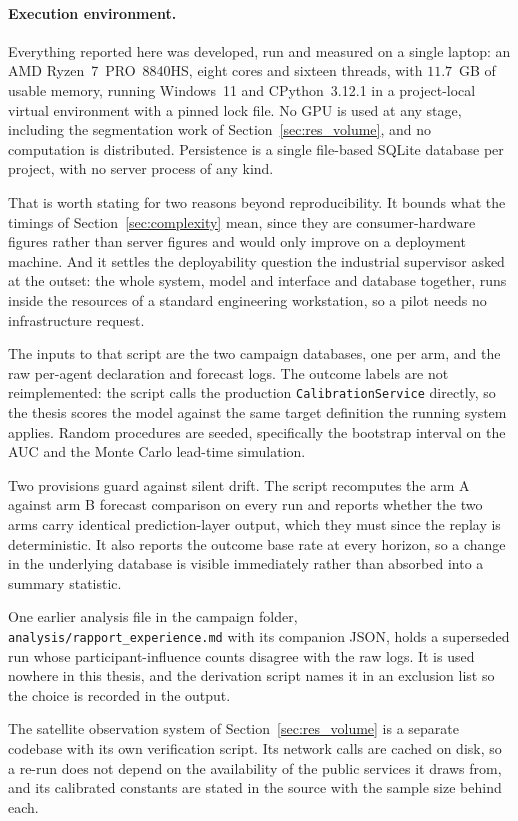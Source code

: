 \paragraph{Execution environment.}
Everything reported here was developed, run and measured on a single laptop: an AMD
Ryzen~7~PRO~8840HS, eight cores and sixteen threads, with $11.7$~GB of usable memory, running
Windows~11 and CPython~3.12.1 in a project-local virtual environment with a pinned lock file.
No GPU is used at any stage, including the segmentation work of
Section~\ref{sec:res_volume}, and no computation is distributed. Persistence is a single
file-based SQLite database per project, with no server process of any kind.

That is worth stating for two reasons beyond reproducibility. It bounds what the timings of
Section~\ref{sec:complexity} mean, since they are consumer-hardware figures rather than
server figures and would only improve on a deployment machine. And it settles the
deployability question the industrial supervisor asked at the outset: the whole system, model
and interface and database together, runs inside the resources of a standard engineering
workstation, so a pilot needs no infrastructure request.

The inputs to that script are the two campaign databases, one per arm, and the raw
per-agent declaration and forecast logs. The outcome labels are not reimplemented: the
script calls the production \texttt{CalibrationService} directly, so the thesis scores the
model against the same target definition the running system applies. Random procedures are
seeded, specifically the bootstrap interval on the AUC and the Monte Carlo lead-time
simulation.

Two provisions guard against silent drift. The script recomputes the arm A against arm B
forecast comparison on every run and reports whether the two arms carry identical
prediction-layer output, which they must since the replay is deterministic. It also reports
the outcome base rate at every horizon, so a change in the underlying database is visible
immediately rather than absorbed into a summary statistic.

One earlier analysis file in the campaign folder,
\texttt{analysis/rapport\_experience.md} with its companion JSON, holds a superseded run whose
participant-influence counts disagree with the raw logs. It is used nowhere in this thesis, and
the derivation script names it in an exclusion list so the choice is recorded in the output.

The satellite observation system of Section~\ref{sec:res_volume} is a separate codebase with
its own verification script. Its network calls are cached on disk, so a re-run does not
depend on the availability of the public services it draws from, and its calibrated
constants are stated in the source with the sample size behind each.


